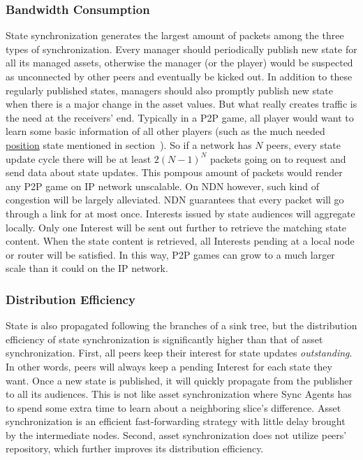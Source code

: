 \documentclass{sigchi}
\begin{document}
\subsubsection{Bandwidth Consumption}
State synchronization generates the largest amount of packets among the three types of synchronization. Every manager should periodically publish new state for all its managed assets, otherwise the manager (or the player) would be suspected as unconnected by other peers and eventually be kicked out. In addition to these regularly published states, managers should also promptly publish new state when there is a major change in the asset values. But what really creates traffic is the need at the receivers' end. Typically in a P2P game, all player would want to learn some basic information of all other players (such as the much needed \url{position} state mentioned in section~). So if a network has $N$ peers, every state update cycle there will be at least $2(N-1)^N$ packets going on to request and send data about state updates. This pompous amount of packets would render any P2P game on IP network unscalable. On NDN however, such kind of congestion will be largely alleviated. NDN guarantees that every packet will go through a link for at most once. Interests issued by state audiences will aggregate locally. Only one Interest will be sent out further to retrieve the matching state content. When the state content is retrieved, all Interests pending at a local node or router will be satisfied. In this way, P2P games can grow to a much larger scale than it could on the IP network.

\subsubsection{Distribution Efficiency}

State is also propagated following the branches of a sink tree, but the distribution efficiency of state synchronization is significantly higher than that of asset synchronization. First, all peers keep their interest for state updates \emph{outstanding}. In other words, peers will always keep a pending Interest for each state they want. Once a new state is published, it will quickly propagate from the publisher to all its audiences. This is not like asset synchronization where Sync Agents has to spend some extra time to learn about a neighboring slice's difference. Asset synchronization is an efficient fast-forwarding strategy with little delay brought by the intermediate nodes. Second, asset synchronization does not utilize peers' repository, which further improves its distribution efficiency.
\end{document}
